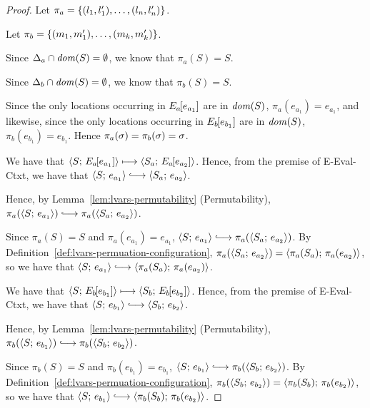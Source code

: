 \begin{proof}
  Let $\pi_a = \left\{(l_1, l'_1), \dots, (l_n, l'_n)\right\}$.

  Let $\pi_b = \left\{(m_1, m'_1), \dots, (m_k, m'_k)\right\}$.

  Since $\Delta_a \cap \mathit{dom}(S) = \emptyset$, we know that $\pi_a(S) = S$.

  Since $\Delta_b \cap \mathit{dom}(S) = \emptyset$, we know that $\pi_b(S) = S$.

  Since the only locations occurring in $E_a\hspace{-1mm}\left[e_{a_1}\right]$ are
  in $\mathit{dom}(S)$, $\pi_a(e_{a_1}) = e_{a_1}$, and likewise, since the
  only locations occurring in $E_b\hspace{-1mm}\left[e_{b_1}\right]$ are in
  $\mathit{dom}(S)$, $\pi_b(e_{b_1}) = e_{b_1}$. Hence $\pi_a(\sigma) =
  \pi_b(\sigma) = \sigma$.


  We have that $\langle S;\, E_a\hspace{-1mm}\left[e_{a_1}\right] \rangle \longmapsto
  \langle S_a;\, E_a\hspace{-1mm}\left[e_{a_2}\right] \rangle$.  Hence, from the premise of
  {\sc E-Eval-Ctxt}, we have that $\config{S}{e_{a_1}}
  \parstepsto \config{S_a}{e_{a_2}}$.

  Hence, by Lemma~\ref{lem:lvars-permutability} (Permutability),
  $\pi_a(\config{S}{e_{a_1}}) \parstepsto
  \pi_a(\config{S_a}{e_{a_2}})$.

  Since $\pi_a(S) = S$ and $\pi_a(e_{a_1}) = e_{a_1}$,
  $\config{S}{e_{a_1}} \parstepsto \pi_a(\config{S_a}{e_{a_2}})$.  By
  Definition~\ref{def:lvars-permuation-configuration},
  $\pi_a(\langle S_a;\, e_{a_2} \rangle) =
  \langle \pi_a(S_a);\, \pi_a(e_{a_2}) \rangle$, so we have that
  $\config{S}{e_{a_1}} \parstepsto
  \config{\pi_a(S_a)}{\pi_a(e_{a_2})}$.

  We have that $\langle S;\, E_b\hspace{-1mm}\left[e_{b_1}\right] \rangle \longmapsto
  \langle S_b;\, E_b\hspace{-1mm}\left[e_{b_2}\right] \rangle$.  Hence, from the premise of
  {\sc E-Eval-Ctxt}, we have that $\config{S}{e_{b_1}}
  \parstepsto \config{S_b}{e_{b_2}}$.

  Hence, by Lemma~\ref{lem:lvars-permutability} (Permutability),
  $\pi_b(\config{S}{e_{b_1}}) \parstepsto
  \pi_b(\config{S_b}{e_{b_2}})$.

  Since $\pi_b(S) = S$ and $\pi_b(e_{b_1}) = e_{b_1}$,
  $\config{S}{e_{b_1}} \parstepsto \pi_b(\config{S_b}{e_{b_2}})$.  By
  Definition~\ref{def:lvars-permuation-configuration},
  $\pi_b(\langle S_b;\, e_{b_2} \rangle) =
  \langle \pi_b(S_b);\, \pi_b(e_{b_2}) \rangle$, so we have that
  $\config{S}{e_{b_1}} \parstepsto
  \config{\pi_b(S_b)}{\pi_b(e_{b_2})}$.



\end{proof}
